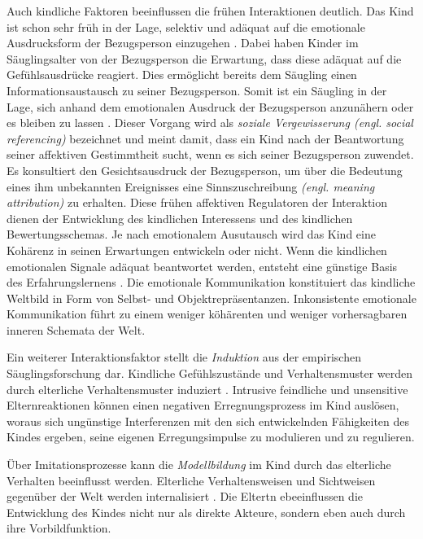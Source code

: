 Auch kindliche Faktoren beeinflussen die frühen Interaktionen deutlich. Das Kind ist schon sehr früh in der Lage, selektiv und adäquat auf die emotionale Ausdrucksform der Bezugsperson einzugehen \cite{Harris1994}. Dabei haben Kinder im Säuglingsalter von der Bezugsperson die Erwartung, dass diese adäquat auf die Gefühlsausdrücke reagiert. Dies ermöglicht bereits dem Säugling einen Informationsaustausch zu seiner Bezugsperson. Somit ist ein Säugling in der Lage, sich anhand dem emotionalen Ausdruck der Bezugsperson anzunähern oder es bleiben zu lassen \cite{Resch1999}. Dieser Vorgang wird als \textit{soziale Vergewisserung (engl. social referencing)} bezeichnet und meint damit, dass ein Kind nach der Beantwortung seiner affektiven Gestimmtheit sucht, wenn es sich seiner Bezugsperson zuwendet. Es konsultiert den Gesichtsausdruck der Bezugsperson, um über die Bedeutung eines ihm unbekannten Ereignisses eine Sinnszuschreibung \textit{(engl. meaning attribution)} zu erhalten. Diese frühen affektiven Regulatoren der Interaktion dienen der Entwicklung des kindlichen Interessens und des kindlichen Bewertungsschemas. Je nach emotionalem Ausutausch wird das Kind eine Kohärenz in seinen Erwartungen entwickeln oder nicht. Wenn die kindlichen emotionalen Signale adäquat beantwortet werden, entsteht eine günstige Basis des Erfahrungslernens \cite[S.~95]{Resch1999}. Die emotionale Kommunikation konstituiert das kindliche Weltbild in Form von Selbst- und Objektrepräsentanzen. Inkonsistente emotionale Kommunikation führt zu einem weniger köhärenten und weniger vorhersagbaren inneren Schemata der Welt. 

Ein weiterer Interaktionsfaktor stellt die \textit{Induktion} aus der empirischen Säuglingsforschung dar. Kindliche Gefühlszustände und Verhaltensmuster werden durch elterliche Verhaltensmuster induziert \cite{Cummings1994}. Intrusive feindliche und unsensitive Elternreaktionen können einen negativen Erregnungsprozess im Kind auslösen, woraus sich ungünstige Interferenzen mit den sich entwickelnden Fähigkeiten des Kindes ergeben, seine eigenen Erregungsimpulse zu modulieren und zu regulieren.  

Über Imitationsprozesse kann die \textit{Modellbildung} im Kind durch das elterliche Verhalten beeinflusst werden. Elterliche Verhaltensweisen und Sichtweisen gegenüber der Welt werden internalisiert \cite{Resch1999}. Die Eltertn ebeeinflussen die Entwicklung des Kindes nicht nur als direkte Akteure, sondern eben auch durch ihre Vorbildfunktion. 

